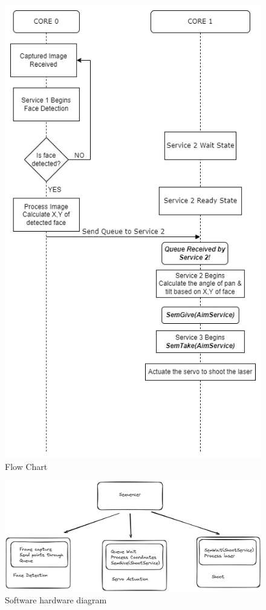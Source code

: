 \documentclass[a4paper,11pt]{article}%
\begin{document}
\begin{figure}[H]
    \centering
    \includegraphics[scale=0.6]{figures/dfd_cfd.jpeg}
    \caption{Flow Chart}
\end{figure}



\begin{figure}[H]
    \centering
    \includegraphics[scale=0.25]{figures/sw_block_diagram.png}
    \caption{Software hardware diagram}
\end{figure}
\end{document}
